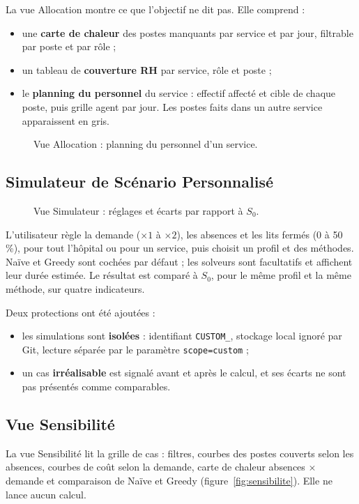 La vue Allocation montre ce que l'objectif ne dit pas. Elle comprend :
\begin{itemize}
    \item une \textbf{carte de chaleur} des postes manquants par service et par jour, filtrable par poste et par rôle ;
    \item un tableau de \textbf{couverture RH} par service, rôle et poste ;
    \item le \textbf{planning du personnel} du service : effectif affecté et cible de chaque poste, puis grille agent par jour. Les postes faits dans un autre service apparaissent en gris.
\end{itemize}

\begin{figure}[H]
    \centering
    \caption{Vue Allocation : planning du personnel d'un service.}
    \label{fig:allocation_planning}
\end{figure}

\subsection{Simulateur de Scénario Personnalisé}
\begin{figure}[H]
    \centering
    \caption{Vue Simulateur : réglages et écarts par rapport à $S_0$.}
    \label{fig:simulateur}
\end{figure}

L'utilisateur règle la demande ($\times 1$ à $\times 2$), les absences et les lits fermés (0 à 50\,\%), pour tout l'hôpital ou pour un service, puis choisit un profil et des méthodes. Naïve et Greedy sont cochées par défaut ; les solveurs sont facultatifs et affichent leur durée estimée. Le résultat est comparé à $S_0$, pour le même profil et la même méthode, sur quatre indicateurs.

Deux protections ont été ajoutées :
\begin{itemize}
    \item les simulations sont \textbf{isolées} : identifiant \texttt{CUSTOM\_}, stockage local ignoré par Git, lecture séparée par le paramètre \texttt{scope=custom} ;
    \item un cas \textbf{irréalisable} est signalé avant et après le calcul, et ses écarts ne sont pas présentés comme comparables.
\end{itemize}

\subsection{Vue Sensibilité}
La vue Sensibilité lit la grille de \NbCas{} cas : filtres, courbes des postes couverts selon les absences, courbes de coût selon la demande, carte de chaleur absences $\times$ demande et comparaison de Naïve et Greedy (figure~\ref{fig:sensibilite}). Elle ne lance aucun calcul.

